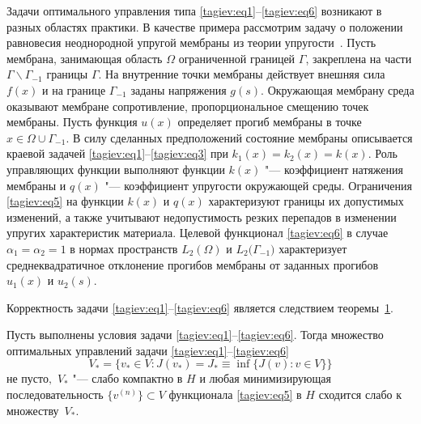 Задачи оптимального управления типа \eqref{tagiev:eq1}--\eqref{tagiev:eq6} возникают в разных областях 
практики. В качестве примера рассмотрим задачу о положении равновесия 
неоднородной упругой мембраны из теории упругости~\cite{tagiev:bib1}. Пусть мембрана, 
занимающая область $\Omega$ ограниченной границей $\Gamma$, закреплена на 
части $\Gamma \backslash \Gamma _{-1}$ границы $\Gamma$. 
На внутренние 
точки мембраны действует внешняя сила $f ( x )$ и на границе 
$\Gamma _{-1} $ заданы напряжения $g ( s )$. Окружающая мембрану 
среда оказывают мембране сопротивление, пропорциональное смещению точек 
мембраны. Пусть функция $u ( x )$ определяет прогиб мембраны в 
точке $x\in \Omega \cup \Gamma _{-1} $. 
В силу сделанных предположений 
состояние мембраны описывается краевой задачей \eqref{tagiev:eq1}--\eqref{tagiev:eq3} при $k_1 ( x 
 )=k_2 ( x )=k ( x )$. Роль управляющих функции 
выполняют функции $k ( x )$ "--- коэффициент натяжения мембраны и 
$q ( x )$ "--- коэффициент упругости окружающей среды. Ограничения \eqref{tagiev:eq5} 
на функции $k ( x )$ и $q ( x )$ характеризуют границы 
их допустимых изменений, а также учитывают недопустимость резких перепадов в 
изменении упругих характеристик материала. 
Целевой функционал \eqref{tagiev:eq6} в случае 
$\alpha _1 =\alpha _2 =1$ в 
нормах пространств $L_2 ( \Omega )$ и $L_2 \big(\Gamma _{-1} \big)$ характеризует среднеквадратичное отклонение  прогибов мембраны от заданных прогибов $u_1 ( x )$ и $u_2  ( s )$. 

\smallskip

 Корректность задачи \eqref{tagiev:eq1}--\eqref{tagiev:eq6} является следствием теоремы~\hyperlink{tag:th1}{1}.

\smallskip
\hypertarget{tag:th1}{}

\begin{theorem}[1]Пусть выполнены условия задачи \eqref{tagiev:eq1}--\eqref{tagiev:eq6}. 
Тогда множество оптимальных управлений задачи \eqref{tagiev:eq1}--\eqref{tagiev:eq6} 
$$V_\ast = \bigl\{   v  _\ast \in V: J ( v  _\ast )=J_\ast \equiv \inf   \{J (  v  ): v  \in V \} \bigr\}$$ не 
пусто$,$ $V_\ast $ "--- слабо компактно в $H$ и любая минимизирующая  последовательность $ \{ v  ^{ ( n )} \}\subset 
V$ функционала \eqref{tagiev:eq5}  в $H$  сходится слабо к множеству~$V_\ast .$
\end{theorem}

\smallskip

